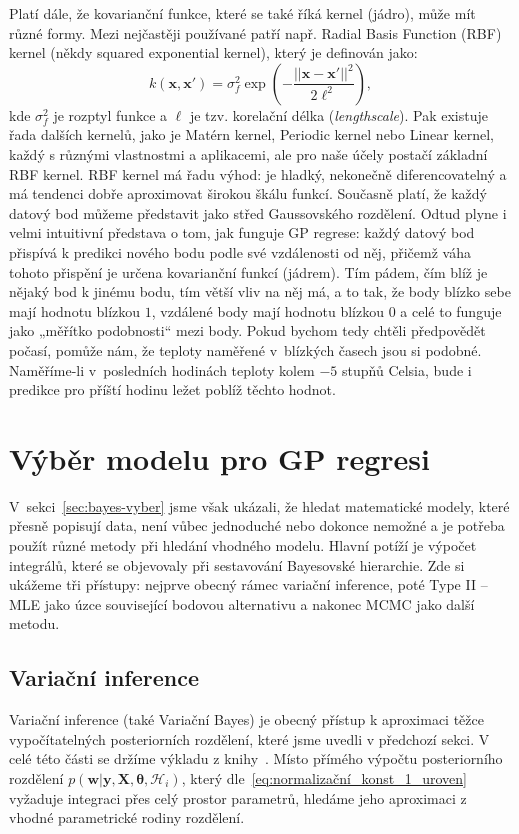 Platí dále, že kovarianční funkce, které se také říká kernel (jádro), může mít různé formy.
Mezi nejčastěji používané patří např. Radial Basis Function (RBF) kernel (někdy squared exponential kernel), který je definován jako:
\begin{equation}
  k(\mathbf{x}, \mathbf{x'}) = \sigma_f^2 \exp\left( -\frac{||\mathbf{x} - \mathbf{x'}||^2}{2\ell^2} \right),
\end{equation}
kde $\sigma_f^2$ je rozptyl funkce a $\ell$ je tzv. korelační délka (\emph{lengthscale}).
Pak existuje řada dalších kernelů, jako je Matérn kernel, Periodic kernel nebo Linear kernel, každý s různými vlastnostmi a aplikacemi, ale pro naše účely postačí základní RBF kernel.
RBF kernel má řadu výhod: je hladký, nekonečně diferencovatelný a má tendenci dobře aproximovat širokou škálu funkcí.
Současně platí, že každý datový bod můžeme představit jako střed Gaussovského rozdělení.
Odtud plyne i velmi intuitivní představa o tom, jak funguje GP regrese: každý datový bod přispívá k predikci nového bodu podle své vzdálenosti od něj, přičemž váha tohoto přispění je určena kovarianční funkcí (jádrem).
Tím pádem, čím blíž je nějaký bod k jinému bodu, tím větší vliv na něj má, a to tak, že body blízko sebe mají hodnotu blízkou $1$, vzdálené body mají hodnotu blízkou $0$ a celé to funguje jako „měřítko podobnosti“ mezi body.
Pokud bychom tedy chtěli předpovědět počasí, pomůže nám, že teploty naměřené v~blízkých časech jsou si podobné.
Naměříme-li v~posledních hodinách teploty kolem $-5$ stupňů Celsia, bude i predikce pro příští hodinu ležet poblíž těchto hodnot.
\par

\section{Výběr modelu pro GP regresi}
\label{sec:vyber-gp}
V~sekci~\ref{sec:bayes-vyber} jsme však ukázali, že hledat matematické modely, které přesně popisují data, není vůbec jednoduché nebo dokonce nemožné a je potřeba použít různé metody při hledání vhodného modelu.
Hlavní potíží je výpočet integrálů, které se objevovaly při sestavování Bayesovské hierarchie.
Zde si ukážeme tři přístupy: nejprve obecný rámec variační inference, poté Type II – MLE jako úzce související bodovou alternativu a nakonec MCMC jako další metodu.

\subsection{Variační inference}
\label{subsec:variacni-inference}
Variační inference (také Variační Bayes) je obecný přístup k aproximaci těžce vypočítatelných posteriorních rozdělení, které jsme uvedli v předchozí sekci.
V celé této části se držíme výkladu z knihy~\cite{bishop2006}.
Místo přímého výpočtu posteriorního rozdělení $p(\mathbf{w} | \mathbf{y}, \mathbf{X}, \boldsymbol{\theta}, \mathcal{H}_i)$, který dle~\eqref{eq:normalizační_konst_1_uroven} vyžaduje integraci přes celý prostor parametrů, hledáme jeho aproximaci z vhodné parametrické rodiny rozdělení.
\par

